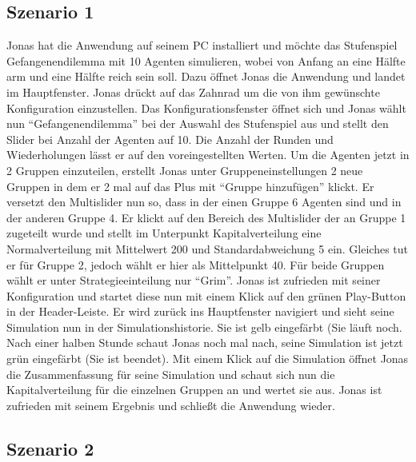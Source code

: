 \documentclass[parskip=full,11pt]{scrartcl}
\begin{document}
\subsection{Szenario 1}
Jonas hat die Anwendung auf seinem PC installiert und möchte das Stufenspiel Gefangenendilemma mit 10 Agenten simulieren, wobei von Anfang an eine Hälfte arm und eine Hälfte reich sein soll. Dazu öffnet Jonas die Anwendung und landet im Hauptfenster. Jonas drückt auf das Zahnrad um die von ihm gewünschte Konfiguration einzustellen. Das Konfigurationsfenster öffnet sich und Jonas wählt nun \enquote{Gefangenendilemma} bei der Auswahl des Stufenspiel aus und stellt den Slider bei Anzahl der Agenten auf 10. Die Anzahl der Runden und Wiederholungen lässt er auf den voreingestellten Werten.
Um die Agenten jetzt in 2 Gruppen einzuteilen, erstellt Jonas unter Gruppeneinstellungen 2 neue Gruppen in dem er 2 mal auf das Plus mit \enquote{Gruppe hinzufügen} klickt. Er versetzt den \Gls{Multislider} nun so, dass in der einen Gruppe 6 Agenten sind und in der anderen Gruppe 4. Er klickt auf den Bereich des \Gls{Multislider} der an Gruppe 1 zugeteilt wurde und stellt im Unterpunkt Kapitalverteilung eine Normalverteilung mit Mittelwert 200 und Standardabweichung 5 ein. Gleiches tut er für Gruppe 2, jedoch wählt er hier als Mittelpunkt 40. Für beide Gruppen wählt er unter Strategieeinteilung nur \enquote{Grim}.
Jonas ist zufrieden mit seiner Konfiguration und startet diese nun mit einem Klick auf den grünen Play-Button in der Header-Leiste.
Er wird zurück ins Hauptfenster navigiert und sieht seine Simulation nun in der Simulationshistorie. Sie ist gelb eingefärbt (Sie läuft noch. Nach einer halben Stunde schaut Jonas noch mal nach, seine Simulation ist jetzt grün eingefärbt (Sie ist beendet). Mit einem Klick auf die Simulation öffnet Jonas die Zusammenfassung für seine Simulation und schaut sich nun die Kapitalverteilung für die einzelnen Gruppen an und wertet sie aus. Jonas ist zufrieden mit seinem Ergebnis und schließt die Anwendung wieder.


\subsection{Szenario 2}
\end{document}
